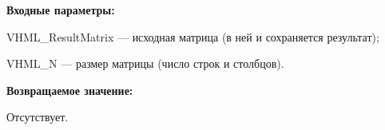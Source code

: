 \textbf{Входные параметры:}  
 
VHML\_ResultMatrix --- исходная матрица (в ней и сохраняется результат);
 
VHML\_N --- размер матрицы (число строк и столбцов).

\textbf{Возвращаемое значение:}

Отсутствует.